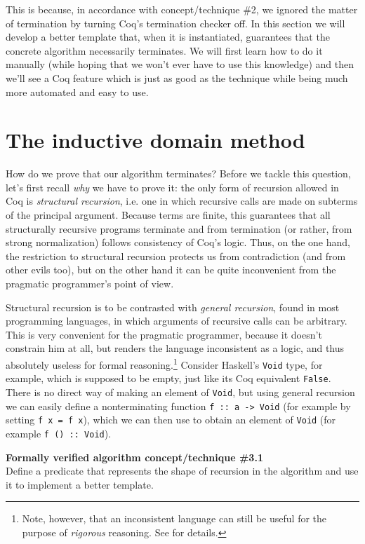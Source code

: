 \documentclass[declaration,mgr,english,shortabstract]{iithesis}
\newcommand{\m}[1]{\texttt{#1}}
\begin{document}
This is because, in accordance with concept/technique \#2, we ignored the matter of termination by turning Coq's termination checker off. In this section we will develop a better template that, when it is instantiated, guarantees that the concrete algorithm necessarily terminates. We will first learn how to do it manually (while hoping that we won't ever have to use this knowledge) and then we'll see a Coq feature which is just as good as the technique while being much more automated and easy to use.

\section{The inductive domain method} \label{inductivedomain}

How do we prove that our algorithm terminates? Before we tackle this question, let's first recall \textit{why} we have to prove it: the only form of recursion allowed in Coq is \textit{structural recursion}, i.e. one in which recursive calls are made on subterms of the principal argument. Because terms are finite, this guarantees that all structurally recursive programs terminate and from termination (or rather, from strong normalization) follows consistency of Coq's logic. Thus, on the one hand, the restriction to structural recursion protects us from contradiction (and from other evils too), but on the other hand it can be quite inconvenient from the pragmatic programmer's point of view.

Structural recursion is to be contrasted with \textit{general recursion}, found in most programming languages, in which arguments of recursive calls can be arbitrary. This is very convenient for the pragmatic programmer, because it doesn't constrain him at all, but renders the language inconsistent as a logic, and thus absolutely useless for formal reasoning.\footnote{Note, however, that an inconsistent language can still be useful for the purpose of \textit{rigorous} reasoning. See \cite{FastAndLoose} for details.} Consider Haskell's \m{Void} type, for example, which is supposed to be empty, just like its Coq equivalent \m{False}. There is no direct way of making an element of \m{Void}, but using general recursion we can easily define a nonterminating function \m{f\ ::\ a -> Void} (for example by setting \m{f x = f x}), which we can then use to obtain an element of \m{Void} (for example \m{f ()\ ::\ Void}).

\begin{center}
    \textbf{Formally verified algorithm concept/technique \#3.1} \\
    Define a predicate that represents the shape of recursion in the algorithm and use it to implement a better template.
\end{center}
\end{document}
